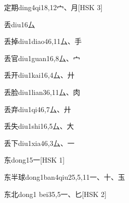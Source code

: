 \begin{entry}{定期}{ding4qi1}{8,12}{⼧、⽉}[HSK 3]
\end{entry}

\begin{entry}{丢}{diu1}{6}{⼛}
\end{entry}

\begin{entry}{丢掉}{diu1diao4}{6,11}{⼛、⼿}
\end{entry}

\begin{entry}{丢官}{diu1guan1}{6,8}{⼛、⼧}
\end{entry}

\begin{entry}{丢开}{diu1kai1}{6,4}{⼛、⼶}
\end{entry}

\begin{entry}{丢脸}{diu1lian3}{6,11}{⼛、⾁}
\end{entry}

\begin{entry}{丢弃}{diu1qi4}{6,7}{⼛、⼶}
\end{entry}

\begin{entry}{丢失}{diu1shi1}{6,5}{⼛、⼤}
\end{entry}

\begin{entry}{丢下}{diu1xia4}{6,3}{⼛、⼀}
\end{entry}

\begin{entry}{东}{dong1}{5}{⼀}[HSK 1]
\end{entry}

\begin{entry}{东半球}{dong1ban4qiu2}{5,5,11}{⼀、⼗、⽟}
\end{entry}

\begin{entry}{东北}{dong1 bei3}{5,5}{⼀、⼔}[HSK 2]
\end{entry}

